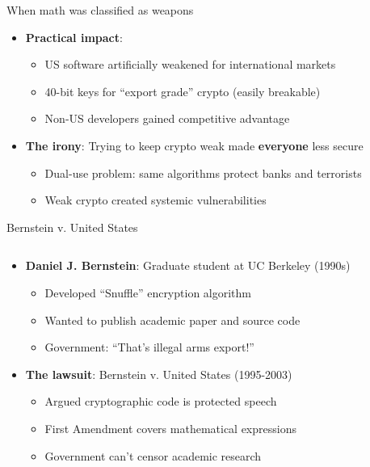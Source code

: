 \documentclass[aspectratio=169, lualatex, handout]{beamer}
\begin{document}
\begin{frame}{When math was classified as weapons}
	\begin{itemize}
		\item \textbf{Practical impact}:
		      \begin{itemize}
			      \item US software artificially weakened for international markets
			      \item 40-bit keys for ``export grade'' crypto (easily breakable)
			      \item Non-US developers gained competitive advantage
		      \end{itemize}
		\item \textbf{The irony}: Trying to keep crypto weak made \textbf{everyone} less secure
		      \begin{itemize}
			      \item Dual-use problem: same algorithms protect banks and terrorists
			      \item Weak crypto created systemic vulnerabilities
		      \end{itemize}
	\end{itemize}
\end{frame}

\begin{frame}{Bernstein v. United States}
	\begin{columns}[c]
		\begin{column}{0.7\textwidth}
			\begin{itemize}
				\item \textbf{Daniel J. Bernstein}: Graduate student at UC Berkeley (1990s)
				      \begin{itemize}
					      \item Developed ``Snuffle'' encryption algorithm
					      \item Wanted to publish academic paper and source code
					      \item Government: ``That's illegal arms export!''
				      \end{itemize}
				\item \textbf{The lawsuit}: Bernstein v. United States (1995-2003)
				      \begin{itemize}
					      \item Argued cryptographic code is protected speech
					      \item First Amendment covers mathematical expressions
					      \item Government can't censor academic research
				      \end{itemize}
			\end{itemize}
		\end{column}
		\begin{column}{0.3\textwidth}
		\end{column}
	\end{columns}
\end{frame}
\end{document}
